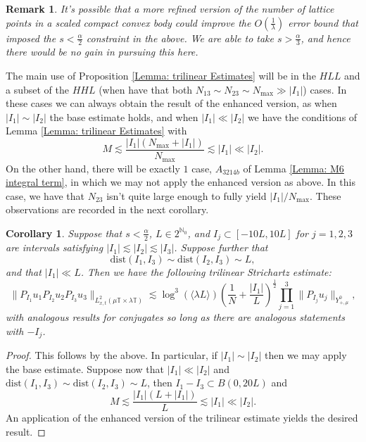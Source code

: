\documentclass[12pt, letterpaper]{amsart}
\newtheorem{remark}{Remark}
\newtheorem{corollary}{Corollary}
\begin{document}
\begin{remark}
    It's possible that a more refined version of the number of lattice points in a scaled compact convex body could improve the $O(\tfrac{1}{\lambda})$ error bound that imposed the $s < \tfrac{\alpha}{2}$ constraint in the above. We are able to take $s > \tfrac{\alpha}{3}$, and hence there would be no gain in pursuing this here.
\end{remark}
The main use of Proposition \ref{Lemma: trilinear Estimates} will be in the $HLL$ and a subset of the $HHL$ (when have that both $N_{13}\sim N_{23}\sim N_{\max}\gg |I_1|$) cases. In these cases we can always obtain the result of the enhanced version, as when $|I_1|\sim |I_2|$ the base estimate holds, and when $|I_1|\ll |I_2|$ we have the conditions of Lemma \ref{Lemma: trilinear Estimates} with
\[
M\lesssim \frac{|I_1|(N_{\max}+|I_1|)}{N_{\max}}\lesssim |I_1|\ll |I_2|.
\]
On the other hand, there will be exactly $1$ case, $A_{3214b}$ of Lemma \ref{Lemma: M6 integral term}, in which we may not apply the enhanced version as above. In this case, we have that $N_{23}$ isn't quite large enough to fully yield $|I_1|/N_{\max}$. These observations are recorded in the next corollary.

\begin{corollary}\label{Corollary: Trilinear Strichartz Specific}
    Suppose that $s < \tfrac{\alpha}{2}$, $L\in 2^{\mathbb{N}_0}$, and $I_j\subset [-10L, 10L]$ for $j = 1, 2,3$ are intervals satisfying $|I_1|\lesssim |I_2|\lesssim |I_3|$. Suppose further that
    \[
    \mathrm{dist}(I_1, I_3)\sim \mathrm{dist}(I_2, I_3)\sim L,
    \]
    and that $|I_1|\ll L$. Then we have the following trilinear Strichartz estimate:
    \[
    \|P_{I_1}u_1P_{I_2}u_2P_{I_3}u_3\|_{L^2_{x,t}(\mu\mathbb{T}\times\lambda\mathbb{T})}\lesssim \log^3(\langle \lambda L\rangle)\left(\frac{1}{N}+\frac{|I_1|}{L}\right)^\frac{1}{2}\prod_{j=1}^3\|P_{I_j}u_j\|_{Y^0_{+,\mu}},
    \]
    with analogous results for conjugates so long as there are analogous statements with $-I_j$.
\end{corollary}
\begin{proof}
    This follows by the above. In particular, if $|I_1|\sim |I_2|$ then we may apply the base estimate. Suppose now that $|I_1|\ll |I_2|$ and $\mathrm{dist}(I_1, I_3)\sim \mathrm{dist}(I_2, I_3)\sim L$, then $I_1-I_3\subset B(0, 20L)$ and
    \[
M \lesssim \frac{|I_1|(L+|I_1|)}{L}\lesssim |I_1| \ll |I_2|.
    \]
    An application of the enhanced version of the trilinear estimate yields the desired result.
\end{proof}
\end{document}
